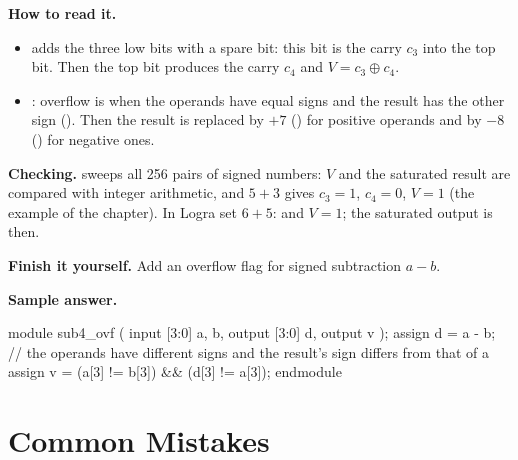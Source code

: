 \textbf{How to read it.}
\begin{itemize}
  \item {} adds the three low bits with a spare bit: this bit is the carry $c_3$ into the top bit. Then the top bit produces the carry $c_4$ and $V=c_3\oplus c_4$.
  \item {}: overflow is when the operands have equal signs and the result has the other sign (). Then the result is replaced by $+7$ () for positive operands and by $-8$ () for negative ones.
\end{itemize}
\textbf{Checking.}  sweeps all 256 pairs of signed numbers:
$V$ and the saturated result are compared with integer arithmetic, and $5+3$
gives $c_3=1$, $c_4=0$, $V=1$ (the example of the chapter). In Logra set
$6+5$:  and $V=1$; the saturated output is  then.

\textbf{Finish it yourself.} Add an overflow flag for signed subtraction $a-b$.

\textbf{Sample answer.}
\begin{vcode}
module sub4_ovf (
    input  [3:0] a, b,
    output [3:0] d,
    output       v
);
    assign d = a - b;
    // the operands have different signs and the result's sign differs from that of a
    assign v = (a[3] != b[3]) && (d[3] != a[3]);
endmodule
\end{vcode}

\section{Common Mistakes}

